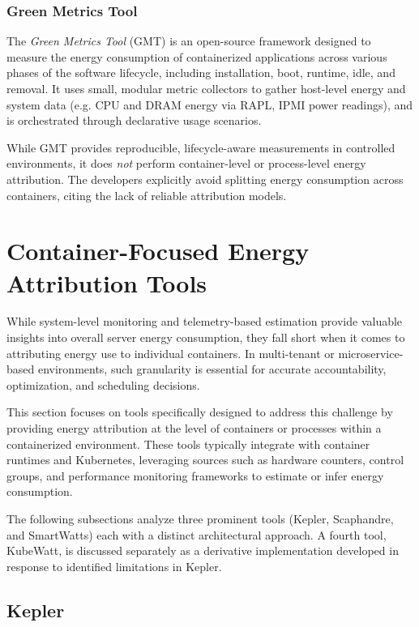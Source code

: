 \subsubsection{Green Metrics Tool}

The \textit{Green Metrics Tool} (GMT)\parencite{greencodingdocs} is an open-source framework designed to measure the energy consumption of containerized applications across various phases of the software lifecycle, including installation, boot, runtime, idle, and removal. It uses small, modular metric collectors to gather host-level energy and system data (e.g. CPU and DRAM energy via RAPL, IPMI power readings), and is orchestrated through declarative usage scenarios.

While GMT provides reproducible, lifecycle-aware measurements in controlled environments, it does \textit{not} perform container-level or process-level energy attribution. The developers explicitly avoid splitting energy consumption across containers, citing the lack of reliable attribution models.

\section{Container-Focused Energy Attribution Tools}
\label{sec:container-tools}

While system-level monitoring and telemetry-based estimation provide valuable insights into overall server energy consumption, they fall short when it comes to attributing energy use to individual containers. In multi-tenant or microservice-based environments, such granularity is essential for accurate accountability, optimization, and scheduling decisions. 

This section focuses on tools specifically designed to address this challenge by providing energy attribution at the level of containers or processes within a containerized environment. These tools typically integrate with container runtimes and Kubernetes, leveraging sources such as hardware counters, control groups, and performance monitoring frameworks to estimate or infer energy consumption.

The following subsections analyze three prominent tools (Kepler, Scaphandre, and SmartWatts) each with a distinct architectural approach. A fourth tool, KubeWatt, is discussed separately as a derivative implementation developed in response to identified limitations in Kepler.

\subsection{Kepler}
\label{sec:kepler}

